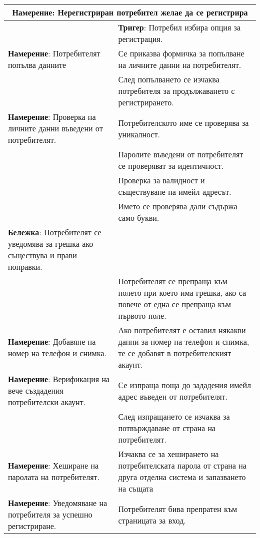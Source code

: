\documentclass[a4paper,12pt]{article}
\begin{document}
\begin{center}
  \begin{tabular}{ |p{5cm}|p{10cm}| }
    \hline
    \multicolumn{2}{|c|}{\textbf{Намерение}: Нерегистриран потребител желае да се регистрира} \\
    \hline
    & \textbf{Тригер}: Потребил избира опция за регистрация. \\
    \hline
      \textbf{Намерение}: Потребителят попълва данните & Се приказва формичка за попълване на личните данни на потребителят. \\
    \hline
     & След попълването се изчаква потребителя за продължаването с регистрирането. \\
    \hline
    \textbf{Намерение}: Проверка на личните данни въведени от потребителят. & Потребителското име се проверява за уникалност. \\
    \hline
     & Паролите въведени от потребителят се проверяват за идентичност. \\
    \hline
     & Проверка за валидност и съществуване на имейл адресът. \\
    \hline
     & Името се проверява дали съдържа само букви. \\
    \hline
    \textbf{Бележка}: Потребителят се уведомява за грешка ако съществува и прави поправки.  & \\
    \hline
      & Потребителят се препраща към полето при което има грешка, ако са повече от една се препраща към първото поле. \\
    \hline
    \textbf{Намерение}: Добавяне на номер на телефон и снимка. & Ако потребителят е оставил някакви данни за номер на телефон и снимка, те се добавят в потребителският акаунт.  \\
    \hline
    \textbf{Намерение}:  Верификация на вече създадения потребителски акаунт. & Се изпраща поща до зададения имейл адрес въведен от потребителят.  \\
    \hline
     & След изпращането се изчаква за потвърждаване от страна на потребителят. \\
    \hline
    \textbf{Намерение}: Хеширане на паролата на потребителят. & Изчаква се за хеширането на потребителската парола от страна на друга отделна система и запазването на същата\\
    \hline
    \textbf{Намерение}: Уведомяване на потребителя за успешно регистриране. & Потребителят бива препратен към страницата за вход. \\
    \hline
  \end{tabular}
\end{center}
\end{document}
